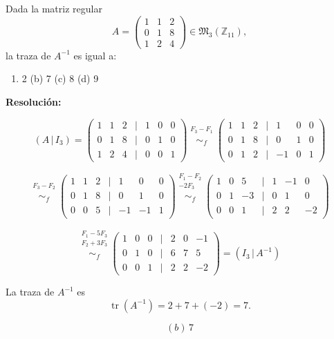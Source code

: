 \documentclass[a4paper,12pt]{article}
\begin{document}
\begin{ejercicio}[title=Ejercicio 15]
Dada la matriz regular 
\[
A =
\begin{pmatrix}
1 & 1 & 2\\
0 & 1 & 8\\
1 & 2 & 4
\end{pmatrix} \in \mathfrak{M}_3(\mathbb{Z}_{11}),
\]
la traza de $A^{-1}$ es igual a:
\begin{enumerate}
\item[(a)] 2 \quad (b) 7 \quad (c) 8 \quad (d) 9
\end{enumerate}

\tcblower
\textbf{Resolución:}

\[
(A \,|\, I_3) =
\begin{pmatrix}
1 & 1 & 2 &\Big|& 1 & 0 & 0\\
0 & 1 & 8 &\Big|& 0 & 1 & 0\\
1 & 2 & 4 &\Big|& 0 & 0 & 1
\end{pmatrix}
\overset{\substack{F_3 - F_1 \\ {}}}{\sim_f}
\begin{pmatrix}
1 & 1 & 2 &\Big|& 1 & 0 & 0\\
0 & 1 & 8 &\Big|& 0 & 1 & 0\\
0 & 1 & 2 &\Big|& -1 & 0 & 1
\end{pmatrix}
\]

\[
\overset{\substack{F_3 - F_2 \\ {}}}{\sim_f}
\begin{pmatrix}
1 & 1 & 2 &\Big|& 1 & 0 & 0\\
0 & 1 & 8 &\Big|& 0 & 1 & 0\\
0 & 0 & 5 &\Big|& -1 & -1 & 1
\end{pmatrix}
\overset{\substack{F_1 - F_2 \\ -2F_3\\ {}}}{\sim_f}
\begin{pmatrix}
1 & 0 & 5 &\Big|& 1 & -1 & 0\\
0 & 1 & -3 &\Big|& 0 & 1 & 0\\
0 & 0 & 1 &\Big|& 2 & 2 & -2
\end{pmatrix}
\]

\[
\overset{\substack{F_1 - 5F_3 \\ F_2 + 3F_3\\ {}}}{\sim_f}
\begin{pmatrix}
1 & 0 & 0 &\Big|& 2 & 0 & -1\\
0 & 1 & 0 &\Big|& 6 & 7 & 5\\
0 & 0 & 1 &\Big|& 2 & 2 & -2
\end{pmatrix}
= (I_3 \,|\, A^{-1})
\]

\noindent
La traza de $A^{-1}$ es
\[
\operatorname{tr}(A^{-1}) = 2 + 7 + (-2) = 7.
\]

\[
\boxed{(b) \, 7}
\]
\end{ejercicio}
\end{document}
